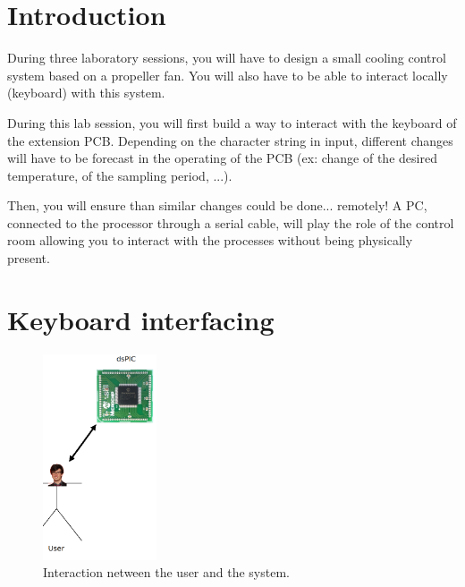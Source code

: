 \documentclass[11pt,a4paper]{article}
\theoremstyle{definition}%
\begin{document}
\section{Introduction}
During three laboratory sessions, you will have to design a small cooling control system based on a propeller fan.
You will also have to be able to interact locally (keyboard) with this system.

During this lab session, you will first build a way to interact with the keyboard of the extension PCB.
Depending on the character string in input, different changes will have to be forecast in the operating of the PCB (ex: change of the desired temperature, of the sampling period, ...).

Then, you will ensure than similar changes could be done... remotely!
A PC, connected to the processor through a serial cable, will play the role of the control room allowing you to interact with the processes without being physically present.









\section{Keyboard interfacing}
\begin{figure}[H]
\center
\includegraphics[width=0.3\textwidth]{utilisateur}
\caption{Interaction netween the user and the system.}
\label{fig:user}
\end{figure}
\end{document}
